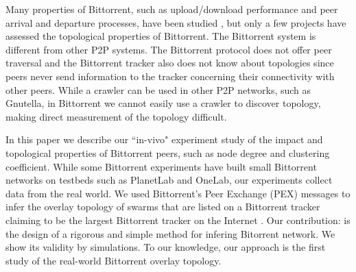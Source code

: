 \documentclass[10pt,conference,letterpaper]{IEEEtran}
\begin{document}
Many properties of Bittorrent, such as upload/download performance and peer arrival and departure processes, have been studied \cite{guo2005measurements}, but only a few projects have assessed the topological properties of Bittorrent.
The Bittorrent system is different from other P2P systems.
The Bittorrent protocol does not offer peer traversal and the Bittorrent tracker also does not know about topologies since peers never send information to the tracker concerning their connectivity with other peers. 
While a crawler can be used in other P2P networks, such as Gnutella, in Bittorrent we cannot easily use a crawler to discover topology, making direct measurement of the topology difficult.

In this paper we describe our ``in-vivo" experiment study of the impact and topological properties of Bittorrent peers, such as node degree and clustering coefficient.  
While some Bittorrent experiments have built small Bittorrent networks on testbeds such as PlanetLab and OneLab, our experiments collect data from the real world. 
We used Bittorrent's Peer Exchange (PEX) messages to infer the overlay topology of swarms that are listed on a Bittorrent tracker claiming to be the largest Bittorrent tracker on the Internet \cite{piratebay}\cite{zhang2010unraveling}.
Our contribution: is the design of a rigorous and simple method for infering Bitorrent network. 
We show its validity by simulations.
To our knowledge, our approach is the first study of the real-world Bittorrent overlay topology.
\end{document}
